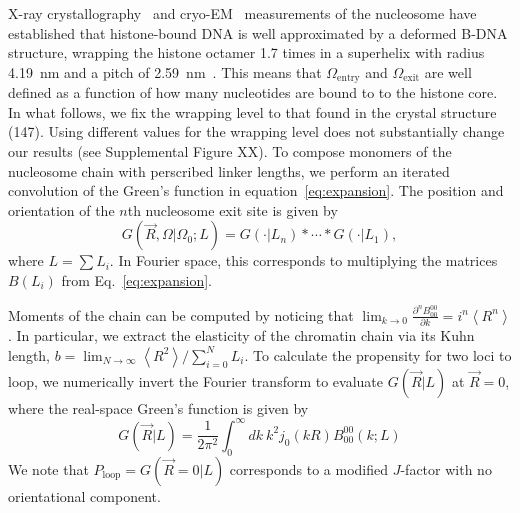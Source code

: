 \documentclass[%
 reprint,
superscriptaddress,
showpacs,preprintnumbers,
 amsmath,amssymb,
 aps,
 prl,
]{revtex4-1}
\newcommand{\greens}[2][\Omega_0; L]{G(#2|#1)}
\newcommand{\RR}{\left\langle{}R^2\right\rangle{}}
\begin{document}
X-ray crystallography~\cite{white2001,richmond2003,cutter2015a} and
    cryo-EM~\cite{bednar2017,bilokapic2018,eltsov2018,wakamori2015,zhou2015}
    measurements of the nucleosome have established that histone-bound DNA is
    well approximated by a deformed B-DNA structure, wrapping the histone
    octamer 1.7 times in a superhelix with radius \SI{4.19}{\nano\metre} and a
    pitch of \SI{2.59}{\nano\metre}~\cite{richmond2003}.
This means that $\Omega_\text{entry}$ and $\Omega_\text{exit}$ are well defined as a
    function of how many nucleotides are bound to to the histone core.
In what follows, we fix the wrapping level to that found in the crystal
    structure (\SI{147}{\basepair}).
Using different values for the wrapping level does not substantially change our
    results (see Supplemental Figure XX).
To compose monomers of the nucleosome chain with perscribed linker lengths, we
    perform an iterated convolution of the Green's function in
    equation~\ref{eq:expansion}.
The position and orientation of the $n$th nucleosome exit site is given by
\begin{equation}\label{eq:conv}
    \greens{\vec{R},\Omega} = \greens[L_n]{\cdot} * \cdots{} * \greens[L_1]{\cdot},
\end{equation}
    where $L = \sum L_i$.
In Fourier space, this corresponds to multiplying the matrices $B(L_i)$
    from Eq.~\ref{eq:expansion}.

Moments of the chain can be computed by noticing that
    $\lim_{k\to0} \frac{\partial^n B_{00}^{00}}{\partial k} = i^n \left\langle
    R^n\right\rangle$.
In particular, we extract the elasticity of the chromatin chain via its Kuhn
    length, $b = \lim_{N\to\infty} \RR/\sum_{i=0}^N L_i$.
To calculate the propensity for two loci to loop, we numerically invert
    the Fourier transform to evaluate $\greens[L]{\vec{R}}$ at $\vec{R} = 0$,
    where the real-space Green's function is given by
\begin{equation}\label{eq:realgreens}
    \greens[L]{\vec{R}} = \frac{1}{2\pi^2}\int_0^\infty dk~k^2 j_0(kR) B_{00}^{00}(k;L)
\end{equation}
We note that $P_\text{loop}=\greens[L]{\vec{R}=0}$ corresponds to a modified $J$-factor with no orientational component.
\end{document}
